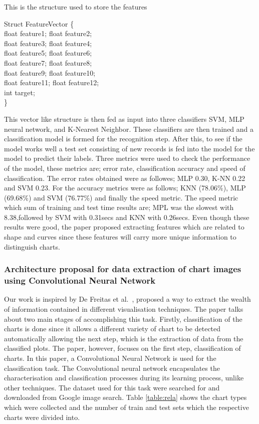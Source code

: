 \documentclass[12pt, a4paper,oneside]{report}
\begin{document}
\begin{algorithm}
\caption{This is the structure used to store the features}
\label{alg:1}
Struct FeatureVector \{\\
	float feature1; float feature2;\\
	float feature3; float feature4;\\
	float feature5; float feature6;\\
	float feature7; float feature8;\\
	float feature9; float feature10;\\
	float feature11; float feature12;\\
	int target;\\
\}
\end{algorithm}

This vector like structure is then fed as input into three classifiers SVM, MLP neural network, and K-Nearest Neighbor. These classifiers are then trained and a classification model is formed for the recognition step. After this, to see if the model works well a test set consisting of new records is fed into the model for the model to predict their labels. Three metrics were used to check the performance of the model, these metrics are; error rate,
classification accuracy and speed of classification. The error rates obtained were as followes; MLP 0.30, K-NN 0.22 and SVM 0.23. For the accuracy metrics were as follows; KNN (78.06\%), MLP (69.68\%) and SVM (76.77\%) and finally the speed metric. The speed metric which sum of training and test time results are; MPL was the slowest with 8.38,followed by SVM with 0.31secs and  KNN with 0.26secs. Even though these results were good, the paper proposed extracting features which are related to shape and curves since these features will carry more unique information to distinguish charts.

\subsubsection{Architecture proposal for data extraction of chart images using Convolutional Neural Network}
Our work is inspired by De Freitas et al.~\cite{junior2017archi}, proposed a way to extract the wealth of information contained in different visualisation techniques. The paper talks about two main stages of accomplishing this task. Firstly, classification of the charts is done since it allows a different variety of chart to be detected automatically allowing the next step, which is the extraction of data from the classified plots. The paper, however, focuses on the first step, classification of charts. In this paper, a Convolutional Neural Network is used for the classification task. The Convolutional neural network encapsulates the characterisation and classification processes during its learning process, unlike other techniques. The dataset used for this task were searched for and downloaded from Google image search. Table \ref{table:rela} shows the chart types which were collected and the number of train and test sets which the respective charts were divided into.
\end{document}
